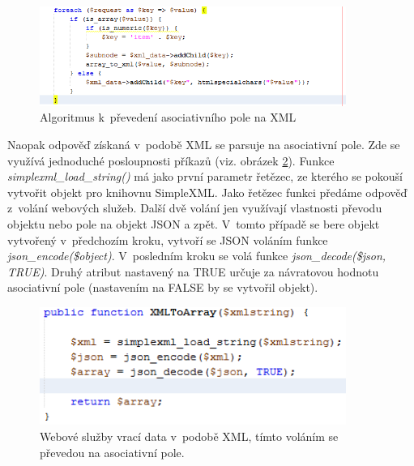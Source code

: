 \documentclass[
print,
  11pt,
  table,   
  nolof,    
  nolot,
  oneside,
  draft
]{fithesis3}
\begin{document}
		\begin{figure}[htb]
		  \begin{center}
		    \includegraphics[width=100mm]{images/prevod_na_xml.png}
		   \end{center}
		  \caption{Algoritmus k~převedení asociativního pole na XML}
		  \label{fig:prevodnaxml}
		\end{figure}
Naopak odpověď získaná v~podobě XML se parsuje na asociativní pole. Zde se využívá jednoduché posloupnosti příkazů (viz. obrázek \ref{fig:prevodnapole}). Funkce \emph{simplexml\_load\_string()} má jako první parametr řetězec, ze kterého se pokouší vytvořit objekt pro knihovnu SimpleXML. Jako řetězec funkci předáme odpověď z~volání webových služeb. Další dvě volání jen využívají vlastnosti převodu objektu nebo pole na objekt JSON a zpět. V~tomto případě se bere objekt vytvořený v~předchozím kroku, vytvoří se JSON voláním funkce \emph{json\_encode(\$object)}. V~posledním kroku se volá funkce \emph{json\_decode(\$json, TRUE)}. Druhý atribut nastavený na TRUE určuje za návratovou hodnotu asociativní pole (nastavením na FALSE by se vytvořil objekt).
		\begin{figure}
		  \begin{center}
		    \includegraphics[width=100mm]{images/xml_na_pole.png}
		   \end{center}
		  \caption{Webové služby vrací data v~podobě XML, tímto voláním se převedou na asociativní pole.}
		  \label{fig:prevodnapole}
		\end{figure}
\end{document}
